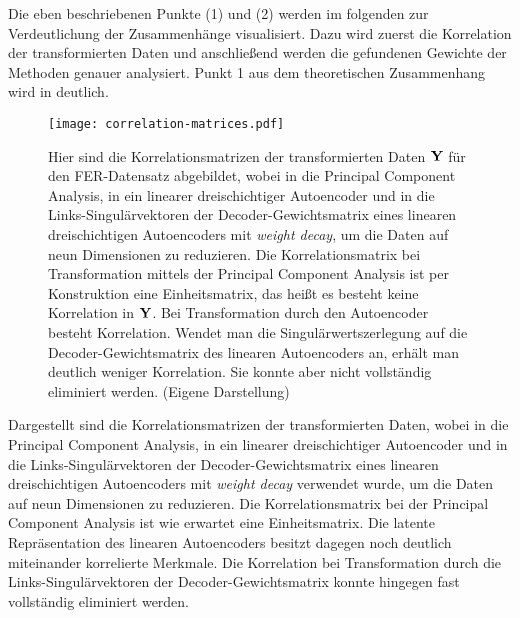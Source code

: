Die eben beschriebenen Punkte (1) und (2) werden im folgenden zur Verdeutlichung der Zusammenhänge
visualisiert. Dazu wird zuerst die Korrelation der transformierten Daten und anschließend werden
die gefundenen Gewichte der Methoden genauer analysiert. Punkt 1 aus dem theoretischen Zusammenhang
wird in  deutlich.
\begin{figure}[ht]
	\centering
	\texttt{[image: correlation-matrices.pdf]}
	\caption[Korrelationsmatrizen der transformierten Daten $\mat{Y}$ für den FER-Datensatz von drei Methoden]{Hier sind die Korrelationsmatrizen der transformierten Daten $\mat{Y}$ für den FER-Datensatz abgebildet, wobei in \captiona die Principal Component Analysis, in \captionb ein linearer dreischichtiger Autoencoder und in \captionc die Links-Singulärvektoren der Decoder-Gewichtsmatrix eines linearen dreischichtigen Autoencoders mit \textit{weight decay}, um die Daten auf neun Dimensionen zu reduzieren. Die Korrelationsmatrix bei Transformation mittels der Principal Component Analysis ist per Konstruktion eine Einheitsmatrix, das heißt es besteht keine Korrelation in $\mat{Y}$. Bei Transformation durch den Autoencoder besteht Korrelation. Wendet man die Singulärwertszerlegung auf die Decoder-Gewichtsmatrix des linearen Autoencoders an, erhält man deutlich weniger Korrelation. Sie konnte aber nicht vollständig eliminiert werden. (Eigene Darstellung)}
	\label{fig:Korrelationsmatrizen}
\end{figure} Dargestellt sind die Korrelationsmatrizen der transformierten Daten, wobei in \captiona die Principal Component Analysis, in \captionb ein linearer dreischichtiger Autoencoder und in \captionc die Links-Singulärvektoren der Decoder-Gewichtsmatrix eines linearen dreischichtigen Autoencoders mit \textit{weight decay} verwendet wurde, um die Daten auf neun Dimensionen zu reduzieren. Die Korrelationsmatrix bei der Principal Component Analysis ist wie erwartet eine Einheitsmatrix. Die latente Repräsentation des linearen Autoencoders besitzt dagegen noch deutlich miteinander korrelierte Merkmale. Die Korrelation bei Transformation durch die Links-Singulärvektoren der Decoder-Gewichtsmatrix konnte hingegen fast vollständig eliminiert werden.

